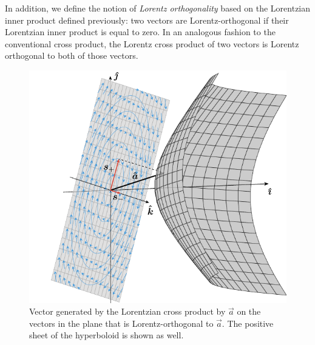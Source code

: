 In addition, we define the notion of \emph{Lorentz orthogonality} based on the Lorentzian inner product defined previously: two vectors are Lorentz-orthogonal if their Lorentzian inner product is equal to zero. In an analogous fashion to the conventional cross product, the Lorentz cross product of two vectors is Lorentz orthogonal to both of those vectors.

\begin{figure}[ht]
    \centering
    \includegraphics[scale=1]{media/other/cross_product.pdf}
    \caption{Vector generated by the Lorentzian cross product by \(\vec{a}\) on the vectors in the plane that is Lorentz-orthogonal to \(\vec{a}\). The positive sheet of the hyperboloid is shown as well.}
    \label{fig:cross_product}
\end{figure}

